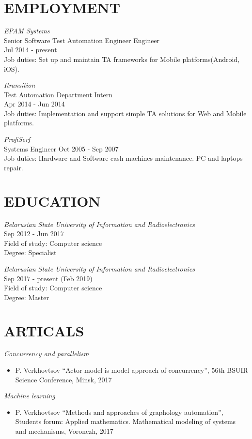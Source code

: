 \documentclass[margin, 10pt]{Stylesheet}
\begin{document}
\begin{resume}
\section{EMPLOYMENT}

\emph{EPAM Systems}\\
Senior Software Test Automation Engineer Engineer\\
Jul 2014 - present\\
Job duties: Set up and maintain TA frameworks for Mobile platforms(Android, iOS).

\emph{Itransition} \\
Test Automation Department Intern\\
Apr 2014 - Jun 2014 \\
Job duties: Implementation and support simple TA solutions for Web and Mobile platforms.

\emph{ProfiSerf} \\
Systems Engineer
Oct 2005 - Sep 2007 \\
Job duties: Hardware and Software cash-machines maintenance. PC and laptops repair.

\section{EDUCATION}

\emph{Belarusian State University of Information and Radioelectronics} \\
Sep 2012 - Jun 2017 \\
Field of study: Computer science \\
Degree: Specialist

\emph{Belarusian State University of Information and Radioelectronics} \\
Sep 2017 - present (Feb 2019) \\
Field of study: Computer science \\
Degree: Master

\section{ARTICALS}
\emph{Concurrency and parallelism}
\begin{itemize} \itemsep -2pt
\item P. Verkhovtsov ``Actor model is model approach of concurrency'', 56th BSUIR Science Conference, Minsk, 2017
\end{itemize}
\emph{Machine learning}
\begin{itemize} \itemsep -2pt
\item P. Verkhovtsov ``Methods and approaches of graphology automation'', Students forum: Applied mathematics. Mathematical modeling of systems and mechanisms, Voronezh, 2017
\end{itemize}

\end{resume}
\end{document}
